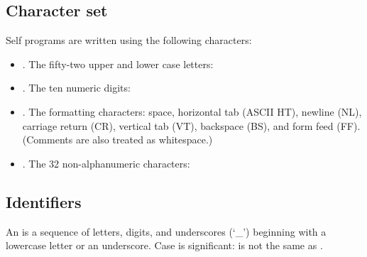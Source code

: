 \documentclass[letterpaper,10pt,english]{sphinxmanual}
\begin{document}

\subsection{Character set}
\label{\detokenize{langref:index-56}}\label{\detokenize{langref:character-set}}
Self programs are written using the following characters:
\begin{itemize}
\item {} 
. The fifty-two upper and lower case letters:
\begin{quote}

\end{quote}

\item {} 
. The ten numeric digits:
\begin{quote}

\end{quote}

\item {} 
. The formatting characters: space, horizontal tab (ASCII HT), newline (NL), carriage return (CR), vertical tab (VT), backspace (BS), and form feed (FF). (Comments are also treated as whitespace.)

\item {} 
. The 32 non-alphanumeric characters:
\begin{quote}

\end{quote}

\end{itemize}


\subsection{Identifiers}
\label{\detokenize{langref:identifiers}}\label{\detokenize{langref:index-60}}
An  is a sequence of letters, digits, and underscores (‘\_’) beginning with a lowercase letter or an underscore. Case is significant:  is not the same as .
\end{document}
